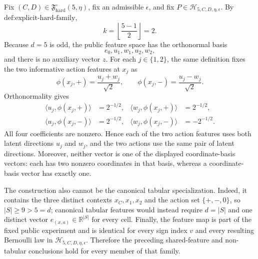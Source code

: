 Fix \((C,D)\in\mathfrak F_{\mathrm{hard}}^\circ(5,\eta)\), fix an admissible \(\epsilon\), and fix \(P\in\mathcal H_{5,C,D,\eta,\epsilon}\). By \(\text{def:explicit-hard-family}\),
\[
k=\left\lfloor\frac{5-1}{2}\right\rfloor=2.
\]
Because \(d=5\) is odd, the public feature space has the orthonormal basis
\[
e_0,u_1,w_1,u_2,w_2,
\]
and there is no auxiliary vector \(z\). For each \(j\in\{1,2\}\), the same definition fixes the two informative action features at \(x_j\) as
\[
\phi(x_j,+)=\frac{u_j+w_j}{\sqrt2},
\qquad
\phi(x_j,-)=\frac{u_j-w_j}{\sqrt2}.
\]
Orthonormality gives
\[
\begin{aligned}
\langle u_j,\phi(x_j,+)\rangle&=2^{-1/2},&
\langle w_j,\phi(x_j,+)\rangle&=2^{-1/2},\\
\langle u_j,\phi(x_j,-)\rangle&=2^{-1/2},&
\langle w_j,\phi(x_j,-)\rangle&=-2^{-1/2}.
\end{aligned}
\]
All four coefficients are nonzero. Hence each of the two action features uses both latent directions \(u_j\) and \(w_j\), and the two actions use the same pair of latent directions. Moreover, neither vector is one of the displayed coordinate-basis vectors: each has two nonzero coordinates in that basis, whereas a coordinate-basis vector has exactly one.

The construction also cannot be the canonical tabular specialization. Indeed, it contains the three distinct contexts \(x_C,x_1,x_2\) and the action set \(\{+,-,0\}\), so \(|S|\ge 9>5=d\); canonical tabular features would instead require \(d=|S|\) and one distinct vector \(e_{(x,a)}\in\mathbb R^{|S|}\) for every cell. Finally, the feature map is part of the fixed public experiment and is identical for every sign index \(v\) and every resulting Bernoulli law in \(\mathcal H_{5,C,D,\eta,\epsilon}\). Therefore the preceding shared-feature and non-tabular conclusions hold for every member of that family.